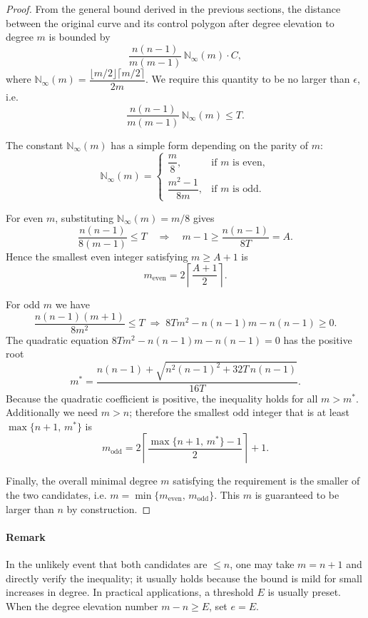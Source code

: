 \documentclass[preprint,12pt]{elsarticle}
\begin{document}
\begin{proof}
From the general bound derived in the previous sections, the distance between the original curve and its control polygon after degree elevation to degree \(m\) is bounded by
\[
\frac{n(n-1)}{m(m-1)}\,\mathbb{N}_{\infty}(m) \cdot C,
\]
where \(\mathbb{N}_{\infty}(m) = \dfrac{\lfloor m/2\rfloor\lceil m/2\rceil}{2m}\).  
We require this quantity to be no larger than \(\epsilon\), i.e.
\[
\frac{n(n-1)}{m(m-1)}\,\mathbb{N}_{\infty}(m) \le T.
\]

The constant \(\mathbb{N}_{\infty}(m)\) has a simple form depending on the parity of \(m\):
\[
\mathbb{N}_{\infty}(m) = 
\begin{cases}
\dfrac{m}{8}, & \text{if } m \text{ is even},\\[6pt]
\dfrac{m^2-1}{8m}, & \text{if } m \text{ is odd}.
\end{cases}
\]

For even \(m\),
substituting \(\mathbb{N}_{\infty}(m)=m/8\) gives
\[
\frac{n(n-1)}{8(m-1)} \le T \quad\Longrightarrow\quad m-1 \ge \frac{n(n-1)}{8T} = A.
\]
Hence the smallest even integer satisfying \(m \ge A+1\) is
\[
m_{\text{even}} = 2\left\lceil\frac{A+1}{2}\right\rceil.
\]

For odd \(m\) we have
\[
\frac{n(n-1)(m+1)}{8m^2} \le T
\;\Longrightarrow\; 8T m^2 - n(n-1)m - n(n-1) \ge 0.
\]
The quadratic equation \(8T m^2 - n(n-1)m - n(n-1)=0\) has the positive root
\[
m^* = \frac{n(n-1) + \sqrt{n^2(n-1)^2 + 32T\, n(n-1)}}{16T}.
\]
Because the quadratic coefficient is positive, the inequality holds for all \(m > m^*\).  
Additionally we need \(m > n\); therefore the smallest odd integer that is at least \(\max\{n+1,\, m^*\}\) is
\[
m_{\text{odd}} = 2\left\lceil\frac{\max\{n+1,\, m^*\} - 1}{2}\right\rceil + 1.
\]

Finally, the overall minimal degree \(m\) satisfying the requirement is the smaller of the two candidates, i.e. \(m = \min\{m_{\text{even}},\, m_{\text{odd}}\}\). This \(m\) is guaranteed to be larger than \(n\) by construction.
\end{proof}

\paragraph*{Remark}
In the unlikely event that both candidates are \(\le n\), one may take \(m = n+1\) and directly verify the inequality; it usually holds because the bound is mild for small increases in degree. In practical applications, a threshold $E$ is usually preset. When the degree elevation number $m - n \ge E $,  set $ e = E $.
\end{document}
